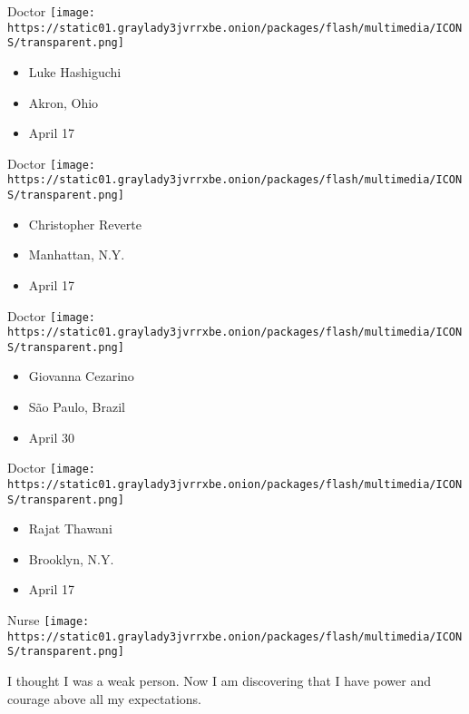 \protect\hyperlink{item-luke-hashiguchi}{}

Doctor
\texttt{[image: https://static01.graylady3jvrrxbe.onion/packages/flash/multimedia/ICONS/transparent.png]}

\begin{itemize}
\tightlist
\item
  Luke Hashiguchi
\item
  Akron, Ohio
\item
  April 17
\end{itemize}

\protect\hyperlink{item-christopher-reverte}{}

Doctor
\texttt{[image: https://static01.graylady3jvrrxbe.onion/packages/flash/multimedia/ICONS/transparent.png]}

\begin{itemize}
\tightlist
\item
  Christopher Reverte
\item
  Manhattan, N.Y.
\item
  April 17
\end{itemize}

\protect\hyperlink{item-giovanna-cezarino}{}

Doctor
\texttt{[image: https://static01.graylady3jvrrxbe.onion/packages/flash/multimedia/ICONS/transparent.png]}

\begin{itemize}
\tightlist
\item
  Giovanna Cezarino
\item
  São Paulo, Brazil
\item
  April 30
\end{itemize}

\protect\hyperlink{item-rajat-thawani}{}

Doctor
\texttt{[image: https://static01.graylady3jvrrxbe.onion/packages/flash/multimedia/ICONS/transparent.png]}

\begin{itemize}
\tightlist
\item
  Rajat Thawani
\item
  Brooklyn, N.Y.
\item
  April 17
\end{itemize}

\protect\hyperlink{item-ilaria-sommonte}{}

Nurse
\texttt{[image: https://static01.graylady3jvrrxbe.onion/packages/flash/multimedia/ICONS/transparent.png]}

I thought I was a weak person. Now I am discovering that I have power
and courage above all my expectations.


